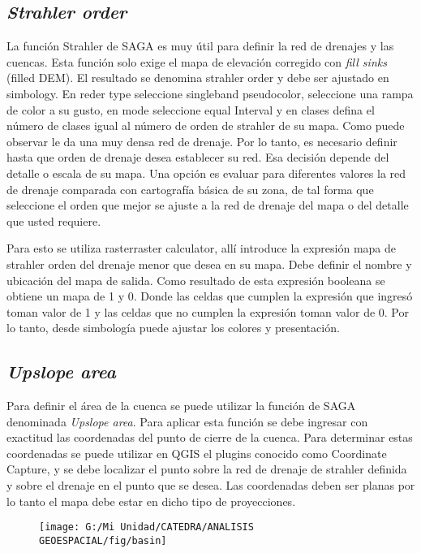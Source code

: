 \documentclass[a4paper,oneside,11pt,]{article}
\begin{document}
\subsection{\emph{Strahler order}}
La función Strahler de SAGA es muy útil para definir la red de drenajes y las cuencas. Esta función solo exige el mapa de elevación corregido con \emph{fill sinks} (filled DEM). El resultado se denomina strahler order y debe ser ajustado en simbology. En reder type seleccione singleband pseudocolor, seleccione una rampa de color a su gusto, en mode seleccione equal Interval y en clases defina el número de clases igual al número de orden de strahler de su mapa.
Como puede observar le da una muy densa red de drenaje. Por lo tanto, es necesario definir hasta que orden de drenaje desea establecer su red. Esa decisión depende del detalle o escala de su mapa. Una opción es evaluar para diferentes valores la red de drenaje comparada con cartografía básica de su zona, de tal forma que seleccione el orden que mejor se ajuste a la red de drenaje del mapa o del detalle que usted requiere.
\par Para esto se utiliza raster\textrightarrow raster calculator, allí introduce la expresión mapa de strahler  orden del drenaje menor que desea en su mapa. Debe definir el nombre y ubicación del mapa de salida. Como resultado de esta expresión booleana se obtiene un mapa de 1 y 0. Donde las celdas que cumplen la expresión que ingresó toman valor de 1 y las celdas que no cumplen la expresión toman valor de 0. Por lo tanto, desde simbología puede ajustar los colores y presentación.

\subsection{\emph{Upslope area}}

Para definir el área de la cuenca se puede utilizar la función de SAGA denominada \emph{Upslope area}. Para aplicar esta función se debe ingresar con exactitud las coordenadas del punto de cierre de la cuenca. Para determinar estas coordenadas se puede utilizar en QGIS el plugins conocido como Coordinate Capture, y se debe localizar el punto sobre la red de drenaje de strahler definida y sobre el drenaje en el punto que se desea. Las coordenadas deben ser planas por lo tanto el mapa debe estar en dicho tipo de proyecciones.

\begin{figure}
\centering
\texttt{[image: G:/Mi Unidad/CATEDRA/ANALISIS GEOESPACIAL/fig/basin]}
\end{figure}
\end{document}
